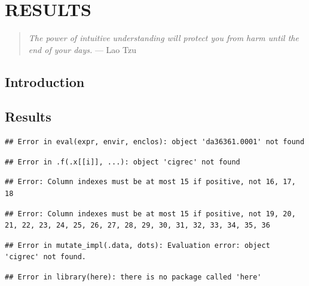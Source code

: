 \documentclass[]{DissertateUSU}
\begin{document}
\singlespacing

\FloatBarrier

\newpage

 \fancyhead[R]{\thepage} \fancyfoot[C]{}

\chapter{RESULTS}

\begin{quote}
\emph{The power of intuitive understanding will protect you from harm until the end of your days.}
--- Lao Tzu
\end{quote}

\doublespacing

\section{Introduction}\label{introduction-1}

\section{Results}\label{results-2}

\begin{verbatim}
## Error in eval(expr, envir, enclos): object 'da36361.0001' not found
\end{verbatim}

\begin{verbatim}
## Error in .f(.x[[i]], ...): object 'cigrec' not found
\end{verbatim}

\begin{verbatim}
## Error: Column indexes must be at most 15 if positive, not 16, 17, 18
\end{verbatim}

\begin{verbatim}
## Error: Column indexes must be at most 15 if positive, not 19, 20, 21, 22, 23, 24, 25, 26, 27, 28, 29, 30, 31, 32, 33, 34, 35, 36
\end{verbatim}

\begin{verbatim}
## Error in mutate_impl(.data, dots): Evaluation error: object 'cigrec' not found.
\end{verbatim}

\begin{verbatim}
## Error in library(here): there is no package called 'here'
\end{verbatim}
\end{document}
